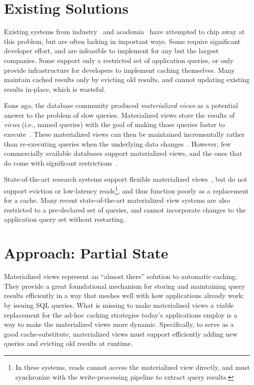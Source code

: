 \section{Existing Solutions}

Existing systems from industry~\cite{facebook-memcache, tao, flannel} and
academia~\cite{txcache, cachegenie, casql-consistency-thesis, pequod} have
attempted to chip away at this problem, but are often lacking in important ways.
Some require significant developer effort, and are infeasible to implement for
any but the largest companies. Some support only a restricted set of application
queries, or only provide infrastructure for developers to implement caching
themselves. Many maintain cached results only by evicting old results, and
cannot updating existing results in-place, which is wasteful.


Eons ago, the database community produced \textit{materialized views} as a
potential answer to the problem of slow queries. Materialized views store the
results of \textit{views} (i.e., named queries) with the goal of making those
queries faster to execute~\cite{materialized-views}. These materialized views
can then be maintained incrementally rather than re-executing queries when the
underlying data changes~\cite{materialized-survey}. However, few commercially
available databases support materialized views, and the ones that do come with
significant restrictions~\cite{mssql-materialized-view-restrictions}.

State-of-the-art research systems support flexible materialized
views~\cite{dbtoaster,materialize}, but do not support eviction or low-latency
reads\footnote{In these systems, reads cannot access the materialized view
directly, and must synchronize with the write-processing pipeline to extract
query results.}, and thus function poorly as a replacement for a cache. Many
recent state-of-the-art materialized view systems are also restricted to a
pre-declared set of queries, and cannot incorporate changes to the application
query set without restarting.

\section{Approach: Partial State}

Materialized views represent an ``almost there'' solution to automatic caching.
They provide a great foundational mechanism for storing and maintaining query
results efficiently in a way that meshes well with how applications already
work: by issuing SQL queries. What is missing to make materialized views a
viable replacement for the ad-hoc caching strategies today's applications employ
is a way to make the materialized views more dynamic. Specifically, to serve as
a good cache-substitute, materialized views must support efficiently adding new
queries and evicting old results at runtime.

